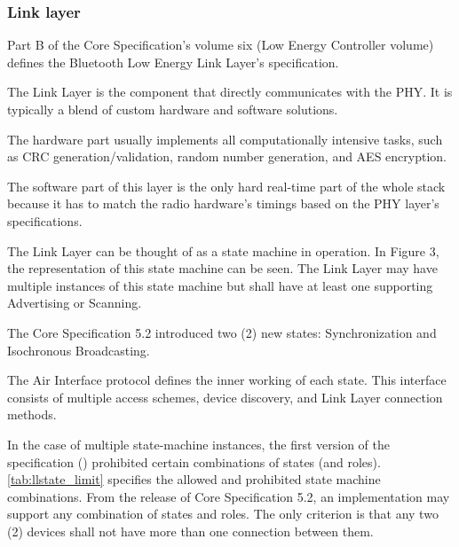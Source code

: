 \subsubsection{Link layer}
\label{ble:controller:link}
Part B of the Core Specification's volume six (Low Energy Controller volume)
defines the Bluetooth Low Energy Link Layer's specification.

The Link Layer is the component that directly communicates with the PHY.
It is typically a blend of custom hardware and software solutions. \cite{Townsend14}

The hardware part usually implements all computationally intensive tasks,
such as CRC generation/validation, random number generation, and AES encryption.

The software part of this layer is the only hard real-time part of
the whole stack because it has to match the radio hardware's timings
based on the PHY layer's specifications.

The Link Layer can be thought of as a state machine in operation.
In Figure 3, the representation of this state machine can be seen.
The Link Layer may have multiple instances of this state machine but shall have at least one supporting Advertising or Scanning.\cite{bt40}

The Core Specification 5.2 introduced two (2) new states:
Synchronization and Isochronous Broadcasting.

The Air Interface protocol defines the inner working of each state.
This interface consists of multiple access schemes, device discovery,
and Link Layer connection methods.

In the case of multiple state-machine instances, the first version of the
specification (\cite{bt40}) prohibited certain combinations of states (and roles).
\autoref{tab:llstate_limit} specifies the allowed and prohibited state machine combinations.
From the release of Core Specification 5.2, an implementation may support
any combination of states and roles. The only criterion is that any two (2)
devices shall not have more than one connection between them. \cite{bt52}

